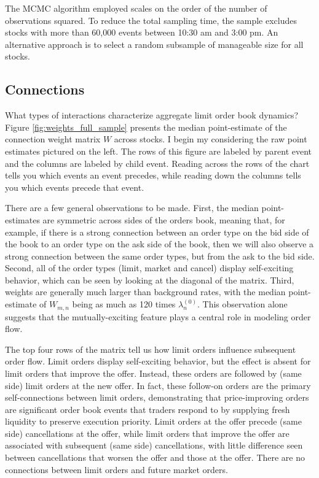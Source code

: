 	The MCMC algorithm employed scales on the order of the number of observations squared. To reduce the total sampling time, the sample excludes stocks with more than 60,000 events between 10:30 am and 3:00 pm. An alternative approach is to select a random subsample of manageable size for all stocks.

	\subsection{Connections}
		What types of interactions characterize aggregate limit order book dynamics? Figure \ref{fig:weights_full_sample} presents the median point-estimate of the connection weight matrix $W$ across stocks. I begin my considering the raw point estimates pictured on the left. The rows of this figure are labeled by parent event and the columns are labeled by child event. Reading across the rows of the chart tells you which events an event precedes, while reading down the columns tells you which events precede that event.

		There are a few general observations to be made. First, the median point-estimates are symmetric across sides of the orders book, meaning that, for example, if there is a strong connection between an order type on the bid side of the book to an order type on the ask side of the book, then we will also observe a strong connection between the same order types, but from the ask to the bid side. Second, all of the order types (limit, market and cancel) display self-exciting behavior, which can be seen by looking at the diagonal of the matrix. Third, weights are generally much larger than background rates, with the median point-estimate of $W_{m,n}$ being as much as 120 times $\lambda_n^{(0)}$. This observation alone suggests that the mutually-exciting feature plays a central role in modeling order flow.

		The top four rows of the matrix tell us how limit orders influence subsequent order flow. Limit orders display self-exciting behavior, but the effect is absent for limit orders that improve the offer. Instead, these orders are followed by (same side) limit orders at the new offer. In fact, these follow-on orders  are the primary self-connections between limit orders, demonstrating that price-improving orders are significant order book events that traders respond to by supplying fresh liquidity to preserve execution priority. Limit orders at the offer precede (same side) cancellations at the offer, while limit orders that improve the offer are associated with subsequent (same side) cancellations, with little difference seen between cancellations that worsen the offer and those at the offer. There are no connections between limit orders and future market orders.

